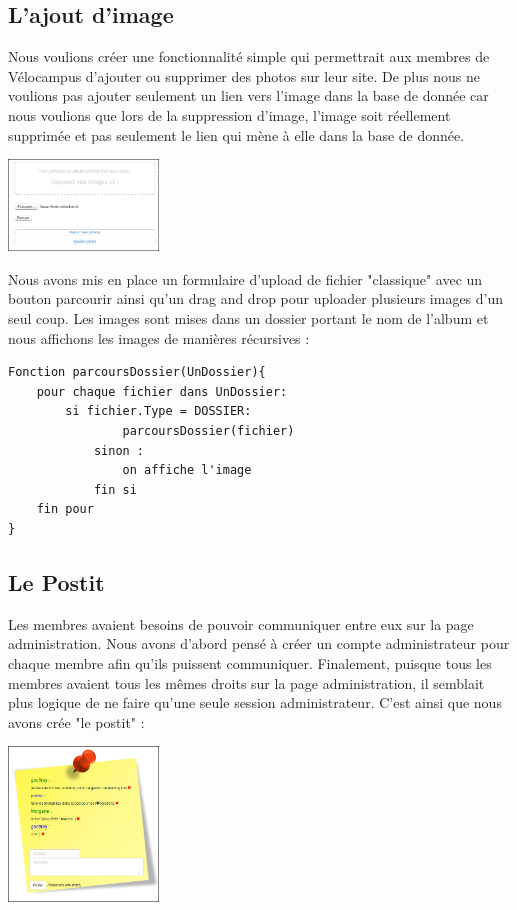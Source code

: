 \documentclass[11pt,a4paper,titlepage]{report}
\begin{document}
\subsection{L'ajout d'image}
Nous voulions créer une fonctionnalité simple qui permettrait aux membres de Vélocampus d'ajouter ou supprimer des photos sur leur site. De plus nous ne voulions pas ajouter seulement un lien vers l'image dans la base de donnée car nous voulions que lors de la suppression d'image, l'image soit réellement supprimée et pas seulement le lien qui mène à elle dans la base de donnée.
\begin{center}
\includegraphics[width=0.3\textwidth]{addImage.jpg}~
\end{center}

Nous avons mis en place un formulaire d'upload de fichier "classique" avec un bouton parcourir ainsi qu'un drag and drop pour uploader plusieurs images d'un seul coup.
Les images sont mises dans un dossier portant le nom de l'album et nous affichons les images de manières récursives :
\begin{verbatim}
Fonction parcoursDossier(UnDossier){
    pour chaque fichier dans UnDossier:
        si fichier.Type = DOSSIER:
        	    parcoursDossier(fichier)
        	sinon : 
        	    on affiche l'image
        	fin si
    fin pour
}
\end{verbatim}
 
\subsection{Le Postit}
Les membres avaient besoins de pouvoir communiquer entre eux sur la page administration. Nous avons d'abord pensé à créer un compte administrateur pour chaque membre afin qu'ils puissent communiquer. Finalement, puisque tous les membres avaient tous les mêmes droits sur la page administration, il semblait plus logique de ne faire qu'une seule session administrateur. C'est ainsi que nous avons crée "le postit" :   
\begin{center}
\includegraphics[width=0.3\textwidth]{postit.jpg}~
\end{center}
\end{document}
